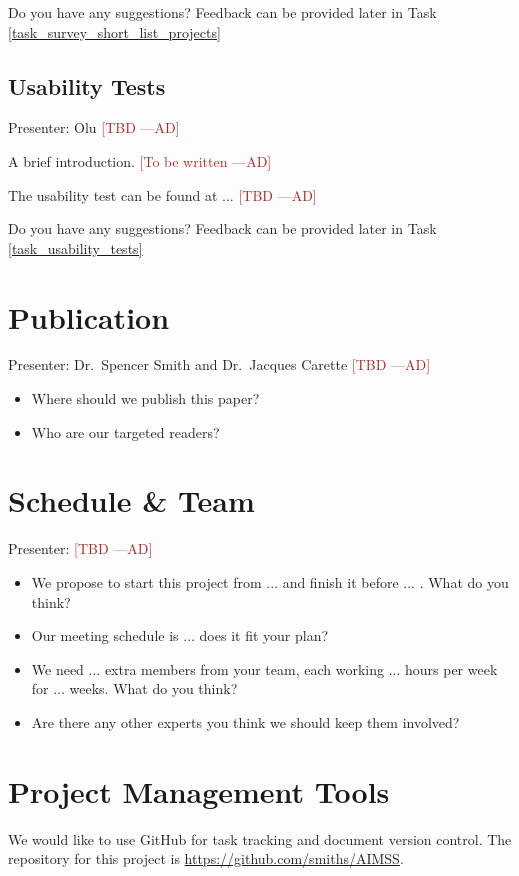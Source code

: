 \documentclass[12pt]{article}
\newcommand{\authornote}[3]{\textcolor{#1}{[#3 ---#2]}}
\newcommand{\authornote}[3]{}
\newcommand{\ad}[1]{\authornote{brown}{AD}{#1}} %
\begin{document}
Do you have any suggestions? Feedback can be provided later in Task
\ref{task_survey_short_list_projects}

\subsection{Usability Tests}
\label{usability_tests}
Presenter: Olu \ad{TBD}

A brief introduction. \ad{To be written}

The usability test can be found at ... \ad{TBD}

Do you have any suggestions? Feedback can be provided later in Task
\ref{task_usability_tests}

\section{Publication}
Presenter: Dr.\ Spencer Smith and Dr.\ Jacques Carette \ad{TBD}

\begin{itemize}
\item Where should we publish this paper?
\item Who are our targeted readers?
\end{itemize}

\section{Schedule \& Team}
Presenter: \ad{TBD}

\begin{itemize}
\item We propose to start this project from ... and finish it before ... . What
do you think?
\item Our meeting schedule is ... does it fit your plan?
\item We need ... extra members from your team, each working ... hours per week
for ... weeks. What do you think?
\item Are there any other experts you think we should keep them involved?
\end{itemize}

\appendix
\section{Project Management Tools}
\label{proj_mgmt_tools}
We would like to use GitHub for task tracking and document version control. The
repository for this project is
\href{https://github.com/smiths/AIMSS}{https://github.com/smiths/AIMSS}.
\end{document}
